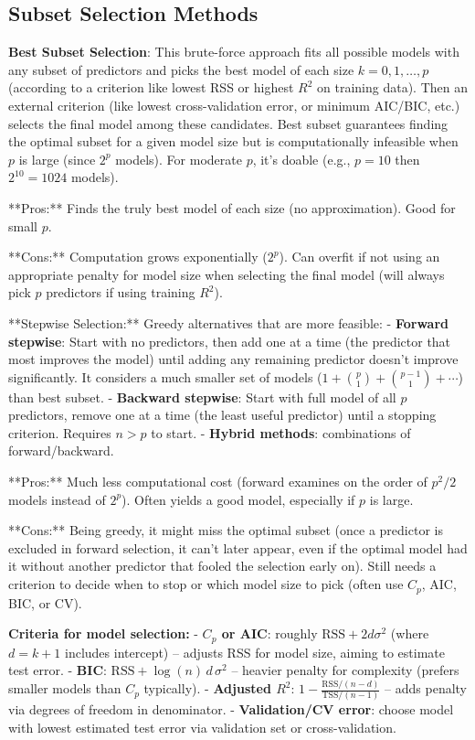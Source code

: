 \documentclass[11pt]{article}
\begin{document}
\subsection{Subset Selection Methods}
\textbf{Best Subset Selection}: This brute-force approach fits all possible models with any subset of predictors and picks the best model of each size $k=0,1,\dots,p$ (according to a criterion like lowest RSS or highest $R^2$ on training data). Then an external criterion (like lowest cross-validation error, or minimum AIC/BIC, etc.) selects the final model among these candidates. Best subset guarantees finding the optimal subset for a given model size but is computationally infeasible when $p$ is large (since $2^p$ models). For moderate $p$, it's doable (e.g., $p=10$ then $2^{10}=1024$ models).

**Pros:** Finds the truly best model of each size (no approximation). Good for small $p$.

**Cons:** Computation grows exponentially ($2^p$). Can overfit if not using an appropriate penalty for model size when selecting the final model (will always pick $p$ predictors if using training $R^2$). 

**Stepwise Selection:** Greedy alternatives that are more feasible:
- \textbf{Forward stepwise}: Start with no predictors, then add one at a time (the predictor that most improves the model) until adding any remaining predictor doesn't improve significantly. It considers a much smaller set of models ($1 + \binom{p}{1} + \binom{p-1}{1} + \cdots$) than best subset.
- \textbf{Backward stepwise}: Start with full model of all $p$ predictors, remove one at a time (the least useful predictor) until a stopping criterion. Requires $n > p$ to start.
- \textbf{Hybrid methods}: combinations of forward/backward.

**Pros:** Much less computational cost (forward examines on the order of $p^2/2$ models instead of $2^p$). Often yields a good model, especially if $p$ is large.

**Cons:** Being greedy, it might miss the optimal subset (once a predictor is excluded in forward selection, it can't later appear, even if the optimal model had it without another predictor that fooled the selection early on). Still needs a criterion to decide when to stop or which model size to pick (often use $C_p$, AIC, BIC, or CV).

\textbf{Criteria for model selection:}
- \textbf{$C_p$ or AIC}: roughly $\text{RSS} + 2d\sigma^2$ (where $d=k+1$ includes intercept) -- adjusts RSS for model size, aiming to estimate test error.
- \textbf{BIC}: $\text{RSS} + \log(n)\,d\,\sigma^2$ -- heavier penalty for complexity (prefers smaller models than $C_p$ typically).
- \textbf{Adjusted $R^2$}: $1 - \frac{\text{RSS}/(n-d)}{\text{TSS}/(n-1)}$ -- adds penalty via degrees of freedom in denominator.
- \textbf{Validation/CV error}: choose model with lowest estimated test error via validation set or cross-validation.
\end{document}
